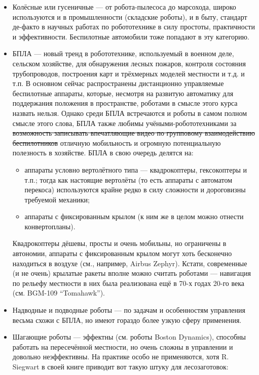 \documentclass{../../text-style}
\begin{document}
\begin{itemize}
    \item Колёсные или гусеничные --- от робота-пылесоса до марсохода, широко используются и в промышленности (складские роботы), и в быту, стандарт де-факто в научных работах по робототехнике в силу простоты, практичности и эффективности.
    Беспилотные автомобили тоже попадают в эту категорию.
    \item БПЛА --- новый тренд в робототехнике, используемый в военном деле, сельском хозяйстве, для обнаружения лесных пожаров, контроля состояния трубопроводов, построения карт и трёхмерных моделей местности и т.д. и т.п.
    В основном сейчас распространены дистанционно управляемые беспилотные аппараты, которые, несмотря на развитую автоматику для поддержания положения в пространстве, роботами в смысле этого курса назвать нельзя.
    Однако среди БПЛА встречаются и роботы в самом полном смысле этого слова, БПЛА также любимы учёными-робототехниками за \sout{возможность записывать впечатляющие видео по групповому взаимодействию беспилотников} отличную мобильность и огромную потенциальную полезность в хозяйстве.
    БПЛА в свою очередь делятся на:
    \begin{itemize}
        \item аппараты условно вертолётного типа --- квадрокоптеры, гексокоптеры и т.п.; тогда как настоящие вертолёты (то есть аппараты с автоматом перекоса) используются крайне редко в силу сложности и дороговизны требуемой механики;
        \item аппараты с фиксированным крылом (к ним же в целом можно отнести конвертопланы).
    \end{itemize}
    Квадрокоптеры дёшевы, просты и очень мобильны, но ограничены в автономии, аппараты с фиксированным крылом могут хоть бесконечно находиться в воздухе (см., например, Airbus Zephyr).
    Кстати, современные (и не очень) крылатые ракеты вполне можно считать роботами --- навигация по рельефу местности в них была реализована ещё в 70-х годах 20-го века (см. BGM-109 \foreignquote{english}{Tomahawk}).
    \item Надводные и подводные роботы --- по задачам и особенностям управления весьма схожи с БПЛА, но имеют гораздо более узкую сферу применения.
    \item Шагающие роботы --- эффектны (см. роботы Boston Dynamics), способны работать на пересечённой местности, но очень сложны в управлении и довольно неэффективны.
    На практике особо не применяются, хотя R. Siegwart в своей книге приводит вот такую штуку для лесозаготовок:

\end{itemize}
\end{document}
